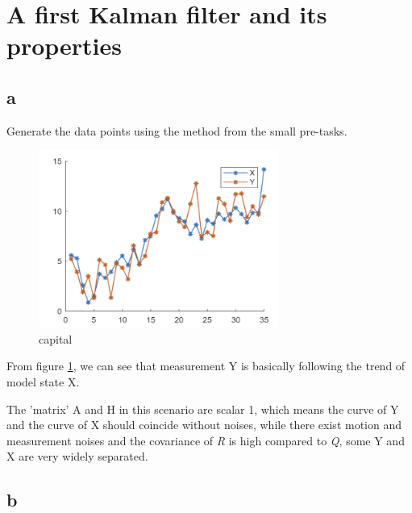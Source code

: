 \section{A first Kalman filter and its properties}
\subsection{a}

Generate the data points using the method from the small pre-tasks.

\begin{figure}[H]
 \centering
 \includegraphics[width=0.7\textwidth]{images/figurefor1a.png}
 \caption{capital}
 \label{1a}
\end{figure}

From figure \ref{1a}, we can see that measurement Y is basically following the trend of model state X. 

The 'matrix' A and H in this scenario are scalar 1, which means the curve of Y and the curve of X should coincide without noises, while there exist motion and measurement noises and the covariance of \emph{R} is high compared to \emph{Q}, some Y and X are very widely separated.

\subsection{b}


